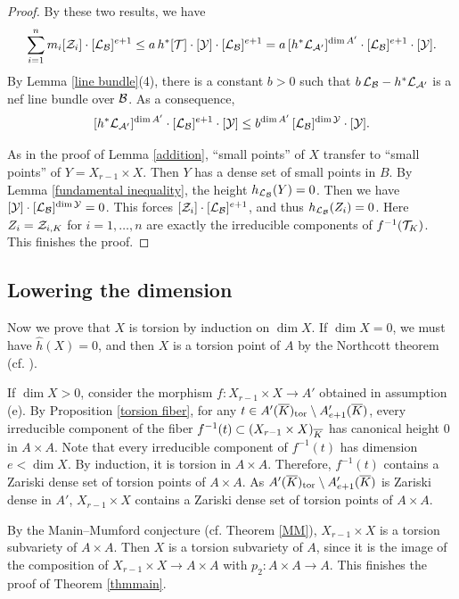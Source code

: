 \documentclass[12pt]{amsart}
\begin{document}
\begin{proof}
By these two results, we have
$$\sum_{i=1}^n m_i[{\mathcal Z}_i]\cdot [{\mathcal L}_{\mathcal B}]^{e+1}
\leq a\,  h^*[{\mathcal T}]\cdot [{\mathcal Y}] \cdot [{\mathcal L}_{\mathcal B}]^{e+1}
=a\, [h^*{\mathcal L}_{{\mathcal A}'}]^{\dim A'} \cdot [{\mathcal L}_{\mathcal B}]^{e+1}\cdot [{\mathcal Y}] .$$
By Lemma \ref{line bundle}(4), there is a constant $b>0$ such that $b\, {\mathcal L}_{\mathcal B}-h^*{\mathcal L}_{{\mathcal A}'}$ is a nef line bundle over ${\mathcal B}$.
As a consequence, 
$$[h^*{\mathcal L}_{{\mathcal A}'}]^{\dim A'} \cdot [{\mathcal L}_{\mathcal B}]^{e+1} \cdot [{\mathcal Y}]
\leq 
b^{\dim A'}\,  [{\mathcal L}_{\mathcal B}]^{\dim {\mathcal Y}} \cdot [{\mathcal Y}].
$$

As in the proof of Lemma \ref{addition},  ``small points'' of $X$ transfer to ``small points'' of $Y=X_{r-1}\times X$.
Then $Y$ has a dense set of small points in $B$.
By Lemma \ref{fundamental inequality}, the height
$h_{{\mathcal L}_{\mathcal B}}(Y)=0$. 
Then we have $ [{\mathcal Y}] \cdot [{\mathcal L}_{\mathcal B}]^{\dim {\mathcal Y}}=0$. 
This forces $[{\mathcal Z}_i]\cdot [{\mathcal L}_{\mathcal B}]^{e+1}$, and thus $h_{{\mathcal L}_{\mathcal B}}(Z_i)=0$.
Here $Z_i={\mathcal Z}_{i,K}$ for $i=1, \dots, n$ are exactly the irreducible components of $f^{-1}({\mathcal T}_K)$. 
This finishes the proof.
\end{proof}




\subsection{Lowering the dimension}

Now we prove that $X$ is torsion by induction on $\dim X$.
If $\dim X=0$, we must have $\hat h(X)=0$, and then $X$ is a torsion point of $A$ by the Northcott theorem (cf. \cite[Theorem 9.15]{Conrad}).  

If $\dim X>0$, consider the morphism $f:X_{r-1}\times X\to A'$ obtained in assumption (e). 
By Proposition \ref{torsion fiber}, for any $t\in A'({\overline{K}})_{\mathrm{tor}}\setminus A'_{e+1}({\overline{K}})$, every irreducible component of the fiber $f^{-1}(t)\subset (X_{r-1}\times X)_{\overline{K}}$ has canonical height 0 in $A\times A$.  
Note that every irreducible component of $f^{-1}(t)$ has dimension $e<\dim X$.
By induction, it is torsion in $A\times A$. 
Therefore, $f^{-1}(t)$ contains a Zariski dense set of torsion points of $A\times A$. 
As $A'({\overline{K}})_{\mathrm{tor}}\setminus A'_{e+1}({\overline{K}})$ is Zariski dense in $A'$,
$X_{r-1}\times X$ contains a Zariski dense set of torsion points of $A\times A$.  

By the Manin--Mumford conjecture (cf. Theorem \ref{MM}), 
$X_{r-1}\times X$ is a torsion subvariety of $A\times A$.  
Then $X$ is a torsion subvariety of $A$, since it is the image of the composition of $X_{r-1}\times X\to A\times A$ with $p_2:A\times A\to A$. 
This finishes the proof of Theorem \ref{thmmain}. 










\end{document}
